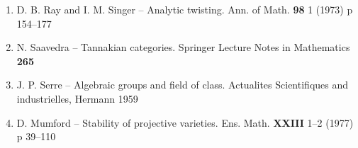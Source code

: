 \documentclass[12pt,a4paper]{article}
\theoremstyle{plain}
\theoremstyle{definition}
\theoremstyle{remark}
\begin{document}
\begin{enumerate}
\item[{[14]}] D. B. Ray and I. M. Singer -- Analytic twisting. Ann. of Math. \textbf{98} 1 (1973) p 154--177

\item[{[15]}] N. Saavedra -- Tannakian categories. Springer Lecture Notes in Mathematics \textbf{265}

\item[{[16]}] J. P. Serre -- Algebraic groups and field of class. Actualites Scientifiques and industrielles, Hermann 1959

\item[{[17]}] D. Mumford -- Stability of projective varieties. Ens. Math. \textbf{XXIII} 1--2 (1977) p 39--110
\end{enumerate}
\end{document}
